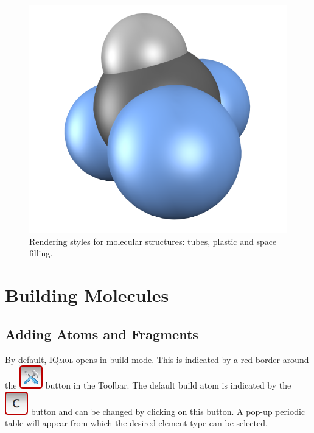 \documentclass[a4paper,12pt]{article}
\newcommand{\iqmol}{\href{http://iqmol.org}{{\scshape IQmol}}}
\begin{document}
\begin{figure}[h]
\begin{center}
\includegraphics[scale=0.20]{figures/CHF3-space.png}
\caption{Rendering styles for molecular structures: tubes, plastic and space filling.}
\label{fig:styles}
\end{center}
\end{figure}


\newpage
\section{Building Molecules}


\subsection{Adding Atoms and Fragments}

By default, \iqmol{} opens in build mode.  This is indicated by a red border
around the \includegraphics[scale=0.40]{figures/BuildButton.png} button in the
Toolbar.   The default build atom is indicated by the
\includegraphics[scale=0.40]{figures/BuildAtomButton.png} button and can be changed
by clicking on this button.  A pop-up periodic table will appear from which the
desired element type can be selected.
\end{document}
